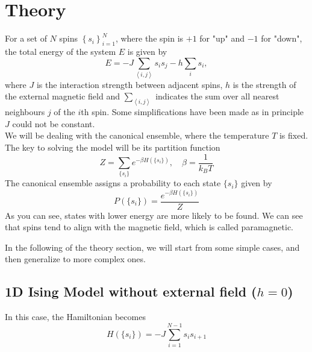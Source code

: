 \documentclass[11pt]{article}
\begin{document}
	\section{Theory}
	
	For a set of $N$ spins $\left\{s_i\right\}_{i=1}^N$, where the spin is $+1$ for "up" and $-1$ for "down", the total energy of the system $E$ is given by\cite{Baierlein_1999}
	\begin{equation}
		E = -J\sum_{\left<i,j\right>}s_is_j - h\sum_i s_i,
	\end{equation}
	where $J$ is the interaction strength between adjacent spins, $h$ is the strength of the external magnetic field and $\sum_{\left<i,j\right>}$ indicates the sum over all nearest neighbours $j$ of the $i$th spin. Some simplifications have been made as in principle $J$ could not be constant. \\
	
	We will be dealing with the canonical ensemble, where the temperature $T$ is fixed. The key to solving the model will be its partition function
	\begin{equation} \label{eq:PartitionFunction}
		Z = \sum_{\{s_i\}} e^{-\beta H(\{s_i\})}, \quad \beta = \frac{1}{k_B T}
	\end{equation}
	The canonical ensemble assigns a probability to each state $\{s_i\}$ given by
	\begin{equation} \label{eq:Probability}
		P(\{s_i\}) = \frac{e^{-\beta H(\{s_i\})}}{Z}
	\end{equation}
	As you can see, states with lower energy are more likely to be found. We can see that spins tend to align with the magnetic field, which is called paramagnetic.


	In the following of the theory section, we will start from some simple cases, and then generalize to more complex ones.

	\subsection{1D Ising Model without external field ($h=0$)}


	In this case, the Hamiltonian becomes
	\begin{equation} \label{eq:Hamiltonian1DNoField}
		H(\{s_i\}) = -J \sum_{i=1}^{N-1} s_i s_{i+1}
	\end{equation}
\end{document}
